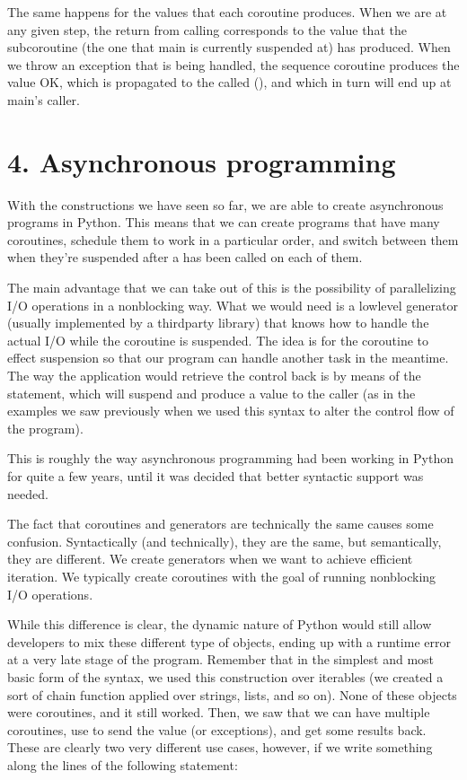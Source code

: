 \documentclass[a4paper,10pt,english]{sphinxmanual}
\begin{document}
The same happens for the values that each coroutine produces. When we are at any given
step, the return from calling  corresponds to the value that the subcoroutine (the
one that main is currently suspended at) has produced. When we throw an exception that is
being handled, the sequence coroutine produces the value OK, which is propagated to the
called (), and which in turn will end up at main’s caller.


\section{4. Asynchronous programming}
\label{\detokenize{chapters/7_generators/index:asynchronous-programming}}
With the constructions we have seen so far, we are able to create asynchronous programs in
Python. This means that we can create programs that have many coroutines, schedule them
to work in a particular order, and switch between them when they’re suspended after a
 has been called on each of them.

The main advantage that we can take out of this is the possibility of parallelizing I/O
operations in a non\sphinxhyphen{}blocking way. What we would need is a low\sphinxhyphen{}level generator (usually
implemented by a third\sphinxhyphen{}party library) that knows how to handle the actual I/O while the
coroutine is suspended. The idea is for the coroutine to effect suspension so that our
program can handle another task in the meantime. The way the application would retrieve
the control back is by means of the  statement, which will suspend and
produce a value to the caller (as in the examples we saw previously when we used this
syntax to alter the control flow of the program).

This is roughly the way asynchronous programming had been working in Python for quite
a few years, until it was decided that better syntactic support was needed.

The fact that coroutines and generators are technically the same causes some confusion.
Syntactically (and technically), they are the same, but semantically, they are different. We
create generators when we want to achieve efficient iteration. We typically create
coroutines with the goal of running non\sphinxhyphen{}blocking I/O operations.

While this difference is clear, the dynamic nature of Python would still allow developers to
mix these different type of objects, ending up with a runtime error at a very late stage of the
program. Remember that in the simplest and most basic form of the  syntax,
we used this construction over iterables (we created a sort of chain function applied over
strings, lists, and so on). None of these objects were coroutines, and it still worked. Then,
we saw that we can have multiple coroutines, use  to send the value (or
exceptions), and get some results back. These are clearly two very different use cases,
however, if we write something along the lines of the following statement:
\end{document}
